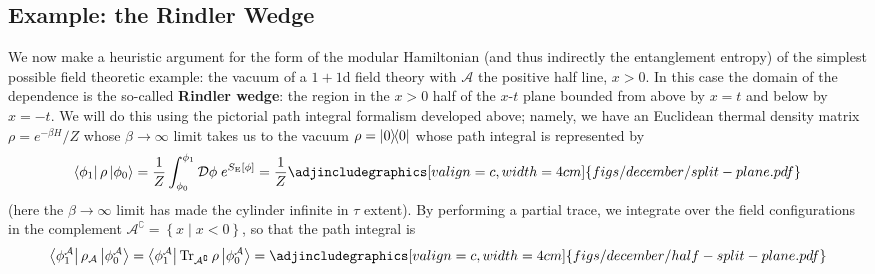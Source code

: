 \documentclass{report}
\begin{document}
\subsection{Example: the Rindler Wedge}
We now make a heuristic argument for the form of the modular Hamiltonian (and thus 
indirectly the entanglement entropy) of the simplest possible field theoretic 
example: the vacuum of a $ 1+1 $d field theory with $ \mathcal{A} $ the positive half line, 
$ x>0 $. In this case the domain of the dependence is the so-called
\textbf{Rindler wedge}: the region in the $ x>0 $ half of the $ x$-$t $ plane 
bounded from above by $ x=t $ and below by $ x=-t $. We will do this using the 
pictorial path integral formalism developed above; namely, we have an Euclidean 
thermal density matrix $ \rho = e^{-\beta H}/Z $ whose $ \beta \rightarrow \infty $
limit takes us to the vacuum $ \rho = \ketbra{0}{0} $ whose path integral is 
represented by
\begin{equation*}
	\bra{\phi_1}\rho\ket{\phi_0} = 
	\frac{1}{Z}\int_{\phi_0}^{\phi_1} \mathcal{D}\phi \; e^{S_{\text{E}}[\phi]}
	= \frac{1}{Z}
	\adjincludegraphics[valign=c, width=4cm]{figs/december/split-plane.pdf}
\end{equation*}
(here the $ \beta \rightarrow \infty $ limit has made the cylinder infinite in $
\tau $ extent). By performing a partial trace, we integrate over the field
configurations in the complement $ \mathcal{A}^\complement = \left\{x \mid
x<0\right\} $, so that the path integral is
\begin{align*}
\bra{\phi_1^\mathcal{A}}\rho_\mathcal{A}\ket{\phi_0^\mathcal{A}}
	= 
\bra{\phi_1^\mathcal{A}}\Tr_{\mathcal{A}^\complement}\rho\ket{\phi_0^\mathcal{A}}
= 
\adjincludegraphics[valign=c, width=4cm]{figs/december/half-split-plane.pdf}
\end{align*}
\end{document}
